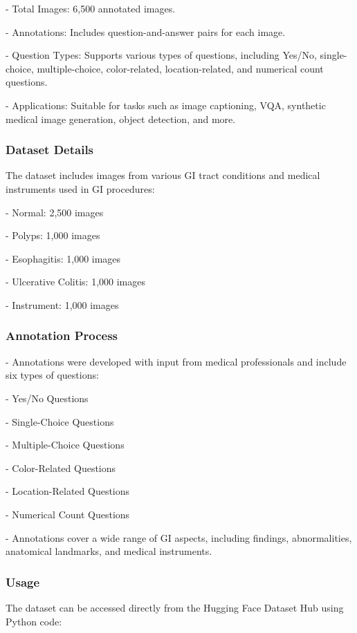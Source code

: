 \documentclass[12pt,a4paper]{report}
\begin{document}
    
 - Total Images: 6,500 annotated images.
    
- Annotations: Includes question-and-answer pairs for each image.
    
- Question Types: Supports various types of questions, including Yes/No, single-choice, multiple-choice, color-related, location-related, and numerical count questions.
    
- Applications: Suitable for tasks such as image captioning, VQA, synthetic medical image generation, object detection, and more.


\subsubsection{Dataset Details}
The dataset includes images from various GI tract conditions and medical instruments used in GI procedures:

    
- Normal: 2,500 images
    
- Polyps: 1,000 images
    
- Esophagitis: 1,000 images
    
- Ulcerative Colitis: 1,000 images
    
- Instrument: 1,000 images


\subsubsection{Annotation Process}

    
- Annotations were developed with input from medical professionals and include six types of questions:
    
        
- Yes/No Questions
        
- Single-Choice Questions
        
- Multiple-Choice Questions
        
- Color-Related Questions
        
- Location-Related Questions
        
- Numerical Count Questions
    
    
- Annotations cover a wide range of GI aspects, including findings, abnormalities, anatomical landmarks, and medical instruments.


\subsubsection{Usage}
The dataset can be accessed directly from the Hugging Face Dataset Hub using Python code:
\end{document}
